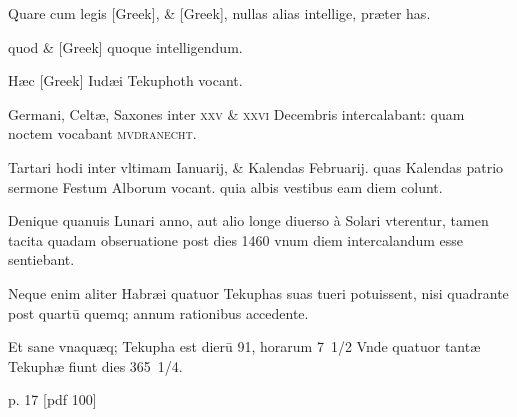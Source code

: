 \begin{parnumbers}
Quare cum legis \textgreek{[Greek]}, \& \textgreek{[Greek]},
nullas alias intellige, præter has.

quod \& \textgreek{[Greek]} quoque intelligendum.

Hæc \textgreek{[Greek]} Iudæi Tekuphoth vocant.

Germani, Celtæ,
Saxones inter \textsc{xxv \& xxvi} Decembris intercalabant: quam noctem
vocabant \textsc{mvdranecht}.

Tartari hodi inter vltimam Ianuarij,
\& Kalendas Februarij. quas Kalendas patrio sermone Festum Alborum
vocant. quia albis vestibus eam diem colunt.

Denique quanuis
Lunari anno, aut alio longe diuerso à Solari vterentur, tamen tacita
quadam obseruatione post dies 1460 vnum diem intercalandum esse
sentiebant.

Neque enim aliter Habræi quatuor Tekuphas suas tueri
potuissent, nisi quadrante post quartū quemq; annum rationibus accedente.

Et sane vnaquæq; Tekupha est dierū 91, horarum 7 1/2 Vnde
quatuor tantæ Tekuphæ fiunt dies 365 1/4.

\end{parnumbers}
\clearpage
p. 17 [pdf 100]
